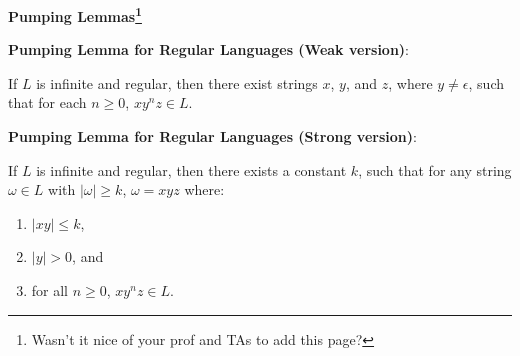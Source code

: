 


\newpage
\begin{center}
\textbf{Pumping Lemmas\footnote{Wasn't it nice of your prof and TAs to add
this page?   \smiley }}
\end{center}

\bigskip
\bigskip

\noindent
\textbf{Pumping Lemma for Regular Languages (Weak version)}:

\noindent
If $L$ is infinite and regular, then there exist strings $x$, $y$, and
$z$, where $y \neq \epsilon$, such that for each $n \geq 0$, $xy^nz \in L$.

\bigskip
\bigskip


\noindent
\textbf{Pumping Lemma for Regular Languages (Strong version)}:

\noindent If $L$ is infinite and regular, then there exists a constant $k$,
such that for any string $\omega \in L$ with $|\omega| \geq k$, $\omega = xyz$
where:

\noindent
\begin{enumerate}


\item $|xy| \leq k$,

\item $|y| > 0$, and

\item for all $n \geq 0$, $xy^nz \in L$.

\end{enumerate}





















